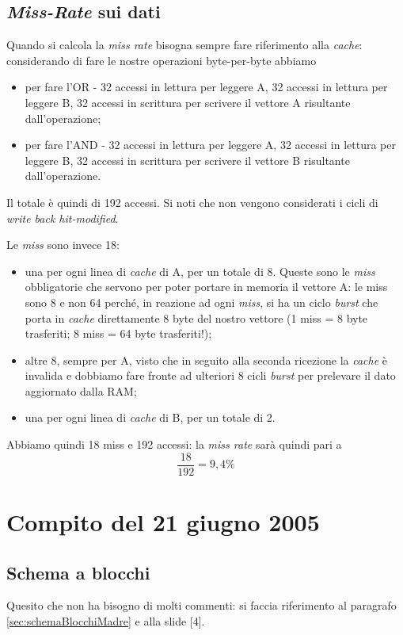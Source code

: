 \subsection{\textit{Miss-Rate} sui dati}

Quando si calcola la \textit{miss rate} bisogna sempre fare riferimento alla \textit{cache}: considerando di fare le nostre operazioni byte-per-byte abbiamo
\begin{itemize}
\item per fare l'OR - 32 accessi in lettura per leggere A, 32 accessi in lettura per leggere B, 32 accessi in scrittura per scrivere il vettore A risultante dall'operazione;
\item per fare l'AND - 32 accessi in lettura per leggere A, 32 accessi in lettura per leggere B, 32 accessi in scrittura per scrivere il vettore B risultante dall'operazione.
\end{itemize}
Il totale è quindi di 192 accessi. Si noti che non vengono considerati i cicli di \textit{write back hit-modified}.


Le \textit{miss} sono invece 18:
\begin{itemize}
\item una per ogni linea di \textit{cache} di A, per un totale di 8. Queste sono le \textit{miss} obbligatorie che servono per poter portare in memoria il vettore A: le miss sono 8 e non 64 perché, in reazione ad ogni \textit{miss}, si ha un ciclo \textit{burst} che porta in \textit{cache} direttamente 8 byte del nostro vettore (1 miss = 8 byte trasferiti; 8 miss = 64 byte trasferiti!);
\item altre 8, sempre per A, visto che in seguito alla seconda ricezione la \textit{cache} è invalida e dobbiamo fare fronte ad ulteriori 8 cicli \textit{burst} per prelevare il dato aggiornato dalla RAM;
\item una per ogni linea di \textit{cache} di B, per un totale di 2.
\end{itemize}

Abbiamo quindi 18 miss e 192 accessi: la \textit{miss rate} sarà quindi pari a
\[
\dfrac{18}{192} = 9,4\% 
\]

\section{Compito del 21 giugno 2005}
\label{sec:21giu05}

\subsection{Schema a blocchi}
Quesito che non ha bisogno di molti commenti: si faccia riferimento al paragrafo \ref{sec:schemaBlocchiMadre} e alla slide [4].

